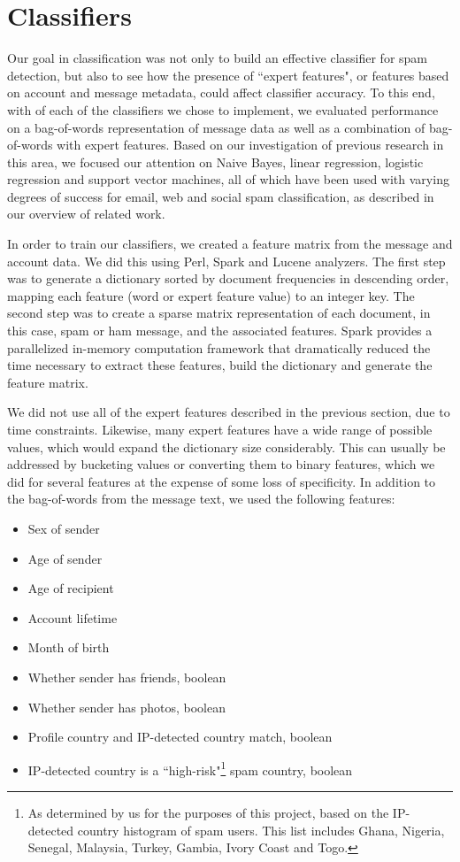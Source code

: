 \documentclass[preprint]{acm_proc_article-sp}
\begin{document}
\section{Classifiers}

Our goal in classification was not only to build an effective classifier for spam detection, 
but also to see how the presence of ``expert features", or features based on account and 
message metadata, could affect classifier accuracy. To this end, with of each of the classifiers 
we chose to implement, we evaluated performance on a bag-of-words representation of message data 
as well as a combination of bag-of-words with expert features. Based on our investigation of 
previous research in this area, we focused our attention on Naive Bayes, linear regression, 
logistic regression and support vector machines, all of which have been used with varying degrees of 
success for email, web and social spam classification, as described in our overview of related work.

In order to train our classifiers, we created a feature matrix from the message and account data. 
We did this using Perl, Spark and Lucene analyzers. The first step was to generate a dictionary sorted by document 
frequencies in descending order, mapping each feature (word or expert feature value) to an integer 
key. The second step was to create a sparse matrix representation of each document, in this case, 
spam or ham message, and the associated features. Spark provides a parallelized in-memory computation 
framework that dramatically reduced the time necessary to extract these features, build the dictionary 
and generate the feature matrix. 

We did not use all of the expert features described in the previous section, due to time constraints. Likewise, 
many expert features have a wide range of possible values, which would expand the dictionary size 
considerably. This can usually be addressed by bucketing values or converting them to binary features, 
which we did for several features at the expense of some loss of specificity. In addition to 
the bag-of-words from the message text, we used the following features:
\begin{itemize}
\item Sex of sender
\item Age of sender
\item Age of recipient
\item Account lifetime
\item Month of birth 
\item Whether sender has friends, boolean
\item Whether sender has photos, boolean
\item Profile country and IP-detected country match, boolean
\item IP-detected country is a ``high-risk"\footnote{As determined by us for the purposes of this project, based on 
the IP-detected country histogram of spam users. This list includes Ghana, Nigeria, Senegal, Malaysia, Turkey, 
Gambia, Ivory Coast and Togo.} spam country, boolean
\end{itemize}
\end{document}
